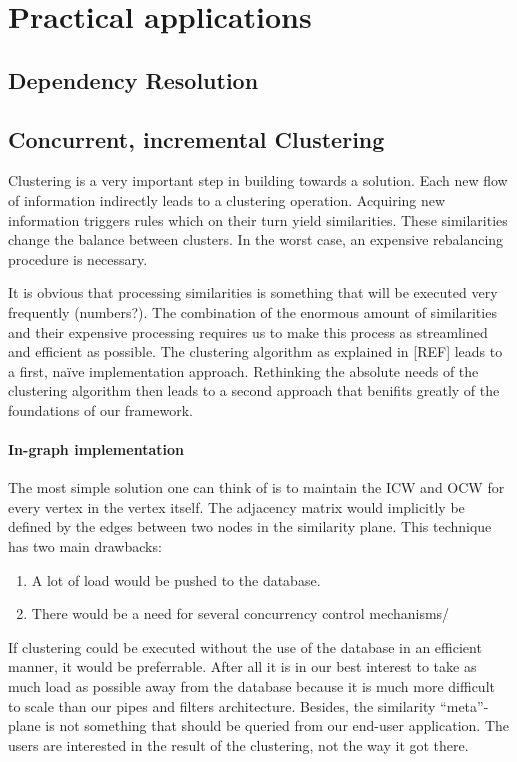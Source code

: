 \section{Practical applications}

\subsection{Dependency Resolution}

\subsection{Concurrent, incremental Clustering}

Clustering is a very important step in building towards a solution. Each new flow of information indirectly leads to a clustering operation. Acquiring new information triggers rules which on their turn yield similarities. These similarities change the balance between clusters. In the worst case, an expensive rebalancing procedure is necessary.

It is obvious that processing similarities is something that will be executed very frequently (numbers?). The combination of the enormous amount of similarities and their expensive processing requires us to make this process as streamlined and efficient as possible. The clustering algorithm as explained in [REF] leads to a first, na\"ive implementation approach. Rethinking the absolute needs of the clustering algorithm then leads to a second approach that benifits greatly of the foundations of our framework.

\paragraph{In-graph implementation} The most simple solution one can think of is to maintain the ICW and OCW for every vertex in the vertex itself. The adjacency matrix would implicitly be defined by the edges between two nodes in the similarity plane. This technique has two main drawbacks:

\begin{enumerate}
\item A lot of load would be pushed to the database.
\item There would be a need for several concurrency control mechanisms/
\end{enumerate}

If clustering could be executed without the use of the database in an efficient manner, it would be preferrable. After all it is in our best interest to take as much load as possible away from the database because it is much more difficult to scale than our pipes and filters architecture. Besides, the similarity ``meta''-plane is not something that should be queried from our end-user application. The users are interested in the result of the clustering, not the way it got there.

